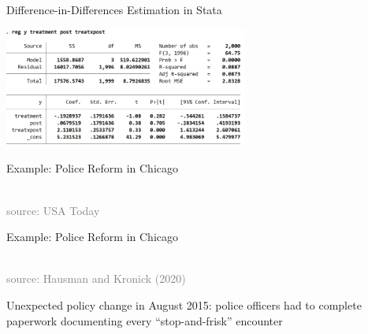 \documentclass[10pt,xcolor=table,ignorenonframetext,aspectratio=169]{beamer}
\begin{document}
\begin{frame}{Difference-in-Differences Estimation in Stata}


\medskip
\begin{center}
	\includegraphics[width=8cm]{img/stataDD.png}
\end{center}


\end{frame}




\begin{frame}{Example: Police Reform in Chicago}

\medskip
\begin{center}
	\\
	\textcolor{gray}{\tiny{source:  USA Today}}
\end{center}

\end{frame}



\begin{frame}{Example: Police Reform in Chicago}

\medskip
\begin{center}
	\\
	\textcolor{gray}{\tiny{source:  Hausman and Kronick (2020)}}
\end{center}

Unexpected policy change in August 2015:
police officers had to complete paperwork documenting every ``stop-and-frisk'' encounter

\end{frame}
\end{document}
